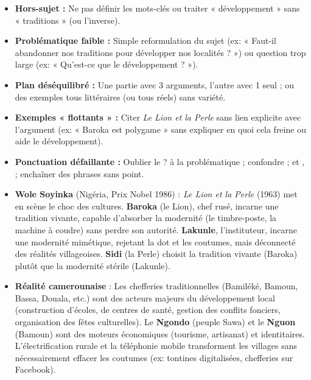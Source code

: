 \documentclass[11pt]{article}
\begin{document}
\begin{attention}
\begin{itemize}
\item \textbf{Hors-sujet :} Ne pas définir les mots-clés ou traiter « développement » sans « traditions » (ou l'inverse).
\item \textbf{Problématique faible :} Simple reformulation du sujet (ex: « Faut-il abandonner nos traditions pour développer nos localités ? ») ou question trop large (ex: « Qu'est-ce que le développement ? »).
\item \textbf{Plan déséquilibré :} Une partie avec 3 arguments, l'autre avec 1 seul ; ou des exemples tous littéraires (ou tous réels) sans variété.
\item \textbf{Exemples « flottants » :} Citer \emph{Le Lion et la Perle} sans lien explicite avec l'argument (ex: « Baroka est polygame » sans expliquer en quoi cela freine ou aide le développement).
\item \textbf{Ponctuation défaillante :} Oublier le ? à la problématique ; confondre ; et , ; enchaîner des phrases sans point.
\end{itemize}
\end{attention}

\begin{savaistu}
\begin{itemize}
\item \textbf{Wole Soyinka} (Nigéria, Prix Nobel 1986) : \emph{Le Lion et la Perle} (1963) met en scène le choc des cultures. \textbf{Baroka} (le Lion), chef rusé, incarne une tradition vivante, capable d'absorber la modernité (le timbre-poste, la machine à coudre) sans perdre son autorité. \textbf{Lakunle}, l'instituteur, incarne une modernité mimétique, rejetant la dot et les coutumes, mais déconnecté des réalités villageoises. \textbf{Sidi} (la Perle) choisit la tradition vivante (Baroka) plutôt que la modernité stérile (Lakunle).
\item \textbf{Réalité camerounaise} : Les chefferies traditionnelles (Bamiléké, Bamoun, Bassa, Douala, etc.) sont des acteurs majeurs du développement local (construction d'écoles, de centres de santé, gestion des conflits fonciers, organisation des fêtes culturelles). Le \textbf{Ngondo} (peuple Sawa) et le \textbf{Nguon} (Bamoun) sont des moteurs économiques (tourisme, artisanat) et identitaires. L'électrification rurale et la téléphonie mobile transforment les villages sans nécessairement effacer les coutumes (ex: tontines digitalisées, chefferies sur Facebook).
\end{itemize}
\end{savaistu}
\end{document}
